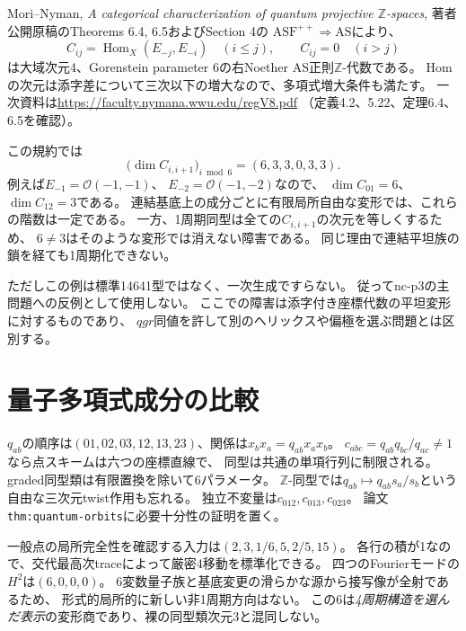 \documentclass[11pt,a4paper]{ltjsarticle}
\begin{document}
Mori--Nyman,
\textit{A categorical characterization of quantum projective $\mathbb Z$-spaces},
著者公開原稿のTheorems 6.4, 6.5およびSection 4の
$\mathrm{ASF}^{++}\Rightarrow\mathrm{AS}$により、
\[
 C_{ij}=\operatorname{Hom}_X(E_{-j},E_{-i})\quad(i\le j),\qquad
 C_{ij}=0\quad(i>j)
\]
は大域次元4、Gorenstein parameter 6の右Noether AS正則$\mathbb Z$-代数である。
Homの次元は添字差について三次以下の増大なので、多項式増大条件も満たす。
一次資料は\url{https://faculty.nymana.wwu.edu/regV8.pdf}
（定義4.2、5.22、定理6.4、6.5を確認）。

この規約では
\[
 \bigl(\dim C_{i,i+1}\bigr)_{i\bmod6}=(6,3,3,0,3,3).
\]
例えば$E_{-1}=\mathcal O(-1,-1)$、
$E_{-2}=\mathcal O(-1,-2)$なので、
$\dim C_{01}=6$、$\dim C_{12}=3$である。
連結基底上の成分ごとに有限局所自由な変形では、これらの階数は一定である。
一方、1周期同型は全ての$C_{i,i+1}$の次元を等しくするため、
$6\ne3$はそのような変形では消えない障害である。
同じ理由で連結平坦族の鎖を経ても1周期化できない。

ただしこの例は標準14641型ではなく、一次生成ですらない。
従ってnc-p3の主問題への反例として使用しない。
ここでの障害は添字付き座標代数の平坦変形に対するものであり、
$qgr$同値を許して別のヘリックスや偏極を選ぶ問題とは区別する。

\section{量子多項式成分の比較}
$q_{ab}$の順序は$(01,02,03,12,13,23)$、関係は$x_bx_a=q_{ab}x_ax_b$。
$c_{abc}=q_{ab}q_{bc}/q_{ac}\ne1$なら点スキームは六つの座標直線で、
同型は共通の単項行列に制限される。
graded同型類は有限置換を除いて6パラメータ。
$\mathbb Z$-同型では$q_{ab}\mapsto q_{ab}s_a/s_b$という自由な三次元twist作用も忘れる。
独立不変量は$c_{012},c_{013},c_{023}$。
論文\texttt{thm:quantum-orbits}に必要十分性の証明を置く。

一般点の局所完全性を確認する入力は$(2,3,1/6,5,2/5,15)$。
各行の積が1なので、交代最高次traceによって厳密4移動を標準化できる。
四つのFourierモードの$H^2$は$(6,0,0,0)$。
6変数量子族と基底変更の滑らかな源から接写像が全射であるため、
形式的局所的に新しい非1周期方向はない。
この6は\emph{4周期構造を選んだ表示}の変形商であり、裸の同型類次元3と混同しない。
\end{document}
